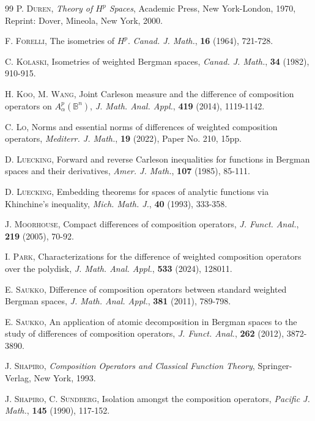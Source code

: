 \documentclass[preprint,12pt,times]{elsarticle}
\theoremstyle{definition}
\theoremstyle{remark}
\numberwithin{equation}{section}
\begin{document}
\begin{thebibliography}{99}
 \textsc{P. Duren}, \textit{Theory of $H^p$ Spaces}, Academic Press, New York-London, 1970, Reprint: Dover, Mineola, New York, 2000.

 \textsc{F. Forelli}, The isometries of $H^p$. \textit{Canad. J. Math.}, \textbf{16} (1964), 721-728.

 \textsc{C. Kolaski}, Isometries of weighted Bergman spaces, \textit{Canad. J. Math.}, \textbf{34} (1982), 910-915.

 \textsc{H. Koo, M. Wang}, Joint Carleson measure and the difference of composition operators on $A_{\alpha}^p(\mathbb{B}^n)$, \textit{J. Math. Anal. Appl.}, \textbf{419} (2014), 1119-1142.

 \textsc{C. Lo}, Norms and essential norms of differences of weighted composition operators, \textit{Mediterr. J. Math.}, \textbf{19} (2022), Paper No. 210, 15pp.

 \textsc{D. Luecking}, Forward and reverse Carleson inequalities for functions in Bergman spaces and their derivatives, \textit{Amer. J. Math.}, \textbf{107} (1985), 85-111.

 \textsc{D. Luecking}, Embedding theorems for spaces of analytic functions via Khinchine's inequality, \textit{Mich. Math. J.}, \textbf{40} (1993), 333-358.

 \textsc{J. Moorhouse}, Compact differences of composition operators, \textit{J. Funct. Anal.}, \textbf{219} (2005), 70-92.

 \textsc{I. Park}, Characterizations for the difference of weighted composition operators over the polydisk, \textit{J. Math. Anal. Appl.}, \textbf{533} (2024), 128011.

 \textsc{E. Saukko}, Difference of composition operators between standard weighted Bergman spaces, \textit{J. Math. Anal. Appl.}, \textbf{381} (2011), 789-798.

 \textsc{E. Saukko}, An application of atomic decomposition in Bergman spaces to the study of differences of composition operators, \textit{J. Funct. Anal.}, \textbf{262} (2012), 3872-3890.

 \textsc{J. Shapiro}, \textit{Composition Operators and Classical Function Theory}, Springer-Verlag, New York, 1993.

 \textsc{J. Shapiro, C. Sundberg}, Isolation amongst the composition operators, \textit{Pacific J. Math.}, \textbf{145} (1990), 117-152.


\end{thebibliography}
\end{document}
